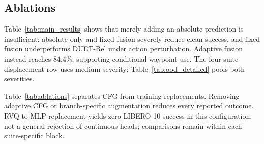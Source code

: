 \documentclass[letterpaper, 10 pt, conference]{ieeeconf}
\begin{document}
\subsection{Ablations}
\label{sec:ablations}
Table~\ref{tab:main_results} shows that merely adding an absolute prediction is insufficient: absolute-only and fixed fusion severely reduce clean success, and fixed fusion underperforms DUET-Rel under action perturbation. Adaptive fusion instead reaches $84.4\%$, supporting conditional waypoint use. The four-suite displacement row uses medium severity; Table~\ref{tab:ood_detailed} pools both severities.

\begin{table}[t]
\caption{Fusion ablations (success, \%). Four-suite $N{=}2000/2000/4000$; matched Object $N{=}500$.}
\label{tab:main_results}
\centering
{}
\end{table}

Table~\ref{tab:ablations} separates CFG from training replacements. Removing adaptive CFG or branch-specific augmentation reduces every reported outcome. RVQ-to-MLP replacement yields zero LIBERO-10 success in this configuration, not a general rejection of continuous heads; comparisons remain within each suite-specific block.
\end{document}
